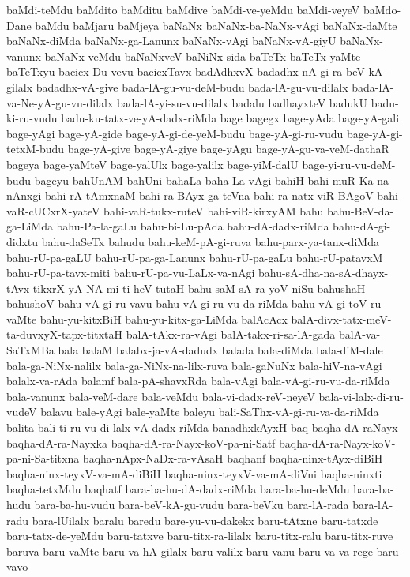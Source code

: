 {baMdi-teMdu
baMdito
baMditu
baMdive
baMdi-ve-yeMdu
baMdi-veyeV
baMdo-Dane
baMdu
baMjaru
baMjeya
baNaNx
baNaNx-ba-NaNx-vAgi
baNaNx-daMte
baNaNx-diMda
baNaNx-ga-Lanunx
baNaNx-vAgi
baNaNx-vA-giyU
baNaNx-vanunx
baNaNx-veMdu
baNaNxveV
baNiNx-sida
baTeTx
baTeTx-yaMte
baTeTxyu
bacicx-Du-vevu
bacicxTavx
badAdhxvX
badadhx-nA-gi-ra-beV-kA-gilalx
badadhx-vA-give
bada-lA-gu-vu-deM-budu
bada-lA-gu-vu-dilalx
bada-lA-va-Ne-yA-gu-vu-dilalx
bada-lA-yi-su-vu-dilalx
badalu
badhayxteV
badukU
badu-ki-ru-vudu
badu-ku-tatx-ve-yA-dadx-riMda
bage
bagegx
bage-yAda
bage-yA-gali
bage-yAgi
bage-yA-gide
bage-yA-gi-de-yeM-budu
bage-yA-gi-ru-vudu
bage-yA-gi-tetxM-budu
bage-yA-give
bage-yA-giye
bage-yAgu
bage-yA-gu-va-veM-dathaR
bageya
bage-yaMteV
bage-yalUlx
bage-yalilx
bage-yiM-dalU
bage-yi-ru-vu-deM-budu
bageyu
bahUnAM
bahUni
bahaLa
baha-La-vAgi
bahiH
bahi-muR-Ka-na-nAnxgi
bahi-rA-tAmxnaM
bahi-ra-BAyx-ga-teVna
bahi-ra-natx-viR-BAgoV
bahi-vaR-cUCxrX-yateV
bahi-vaR-tukx-ruteV
bahi-viR-kirxyAM
bahu
bahu-BeV-da-ga-LiMda
bahu-Pa-la-gaLu
bahu-bi-Lu-pAda
bahu-dA-dadx-riMda
bahu-dA-gi-didxtu
bahu-daSeTx
bahudu
bahu-keM-pA-gi-ruva
bahu-parx-ya-tanx-diMda
bahu-rU-pa-gaLU
bahu-rU-pa-ga-Lanunx
bahu-rU-pa-gaLu
bahu-rU-patavxM
bahu-rU-pa-tavx-miti
bahu-rU-pa-vu-LaLx-va-nAgi
bahu-sA-dha-na-sA-dhayx-tAvx-tikxrX-yA-NA-mi-ti-heV-tutaH
bahu-saM-sA-ra-yoV-niSu
bahushaH
bahushoV
bahu-vA-gi-ru-vavu
bahu-vA-gi-ru-vu-da-riMda
bahu-vA-gi-toV-ru-vaMte
bahu-yu-kitxBiH
bahu-yu-kitx-ga-LiMda
balAcAcx
balA-divx-tatx-meV-ta-duvxyX-tapx-titxtaH
balA-tAkx-ra-vAgi
balA-takx-ri-sa-lA-gada
balA-va-SaTxMBa
bala
balaM
balabx-ja-vA-dadudx
balada
bala-diMda
bala-diM-dale
bala-ga-NiNx-nalilx
bala-ga-NiNx-na-lilx-ruva
bala-gaNuNx
bala-hiV-na-vAgi
balalx-va-rAda
balamf
bala-pA-shavxRda
bala-vAgi
bala-vA-gi-ru-vu-da-riMda
bala-vanunx
bala-veM-dare
bala-veMdu
bala-vi-dadx-reV-neyeV
bala-vi-lalx-di-ru-vudeV
balavu
bale-yAgi
bale-yaMte
baleyu
bali-SaThx-vA-gi-ru-va-da-riMda
balita
bali-ti-ru-vu-di-lalx-vA-dadx-riMda
banadhxkAyxH
baq
baqha-dA-raNayx
baqha-dA-ra-Nayxka
baqha-dA-ra-Nayx-koV-pa-ni-Satf
baqha-dA-ra-Nayx-koV-pa-ni-Sa-titxna
baqha-nApx-NaDx-ra-vAsaH
baqhanf
baqha-ninx-tAyx-diBiH
baqha-ninx-teyxV-va-mA-diBiH
baqha-ninx-teyxV-va-mA-diVni
baqha-ninxti
baqha-tetxMdu
baqhatf
bara-ba-hu-dA-dadx-riMda
bara-ba-hu-deMdu
bara-ba-hudu
bara-ba-hu-vudu
bara-beV-kA-gu-vudu
bara-beVku
bara-lA-rada
bara-lA-radu
bara-lUilalx
baralu
baredu
bare-yu-vu-dakekx
baru-tAtxne
baru-tatxde
baru-tatx-de-yeMdu
baru-tatxve
baru-titx-ra-lilalx
baru-titx-ralu
baru-titx-ruve
baruva
baru-vaMte
baru-va-hA-gilalx
baru-valilx
baru-vanu
baru-va-va-rege
baru-vavo
}

